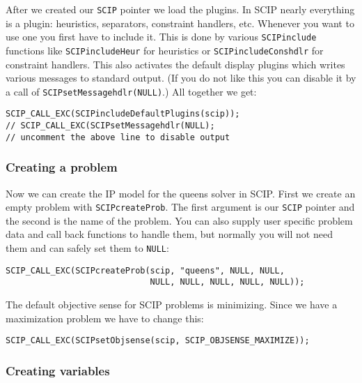 \documentclass[a4paper]{article}
\begin{document}
After we created our \verb+SCIP+ pointer we load the plugins. In SCIP nearly everything is a plugin:
heuristics, separators, constraint handlers, etc. Whenever you want to use one you first have to include
it. This is done by various \verb+SCIPinclude+ functions like \verb+SCIPincludeHeur+ for heuristics
or \verb+SCIPincludeConshdlr+ for constraint handlers. This also activates the default display plugins
which writes various messages to standard output. (If you do not like this you can disable it by a call of
\verb+SCIPsetMessagehdlr(NULL)+.) All together we get:
\begin{verbatim}
SCIP_CALL_EXC(SCIPincludeDefaultPlugins(scip));
// SCIP_CALL_EXC(SCIPsetMessagehdlr(NULL);
// uncomment the above line to disable output
\end{verbatim}

\subsubsection{Creating a problem}

Now we can create the IP model for the queens solver in SCIP. First we create an empty problem with
\verb+SCIPcreateProb+. The first argument is our \verb+SCIP+ pointer and the second is the name
of the problem. You can also supply user specific problem data and call back functions to handle them,
but normally you will not need them and can safely set them to \verb+NULL+:
\begin{verbatim}
SCIP_CALL_EXC(SCIPcreateProb(scip, "queens", NULL, NULL,
                             NULL, NULL, NULL, NULL, NULL));
\end{verbatim}
The default objective sense for SCIP problems is minimizing. Since we have a maximization problem we have to change this:
\begin{verbatim}
SCIP_CALL_EXC(SCIPsetObjsense(scip, SCIP_OBJSENSE_MAXIMIZE));
\end{verbatim}


\subsubsection{Creating variables}
\end{document}
